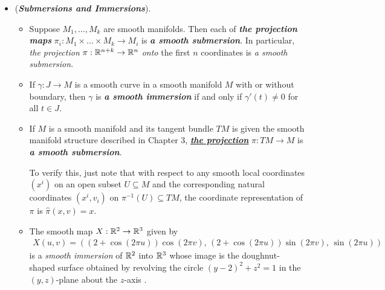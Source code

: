 \documentclass[11pt]{article}
\begin{document}
\begin{itemize}
\item \begin{example}(\emph{\textbf{Submersions and Immersions}}).
\begin{itemize}
\item Suppose $M_1,\ldots,M_k$ are smooth manifolds. Then each of \emph{\textbf{the projection maps}} $\pi_{i}: M_1\times \ldots \times M_k \rightarrow M_i$ is \emph{\textbf{a smooth submersion}}. In particular, \emph{the projection} $\pi: {\mathbb R}^{n+k} \rightarrow {\mathbb R}^n$ \emph{onto} the first $n$ coordinates is \emph{a smooth submersion}.
\item If $\gamma: J \rightarrow M$ is a smooth curve in a smooth manifold $M$ with or without boundary, then $\gamma$ is \emph{\textbf{a smooth immersion}} if and only if $\gamma'(t) \neq 0$ for all $t \in J$.
\item If $M$ is a smooth manifold and its tangent bundle $TM$ is given the smooth manifold structure described in Chapter 3, \underline{\emph{\textbf{the projection}}} $\pi: TM \rightarrow M$ is \emph{\textbf{a smooth submersion}}. 

To verify this, just note that with respect to any smooth local coordinates $(x^i)$ on an open subset $U \subseteq M$ and the corresponding natural coordinates $(x^i, v_i)$ on  $\pi^{-1}(U) \subseteq TM$, the coordinate representation of $\pi$ is $\widehat{\pi}(x, v) = x$.
\item The smooth map $X: {\mathbb R}^2 \rightarrow {\mathbb R}^3$ given by
\begin{align*}
X(u,v) =  ((2+ \cos(2\pi u))\cos(2\pi v),\, (2+\cos(2\pi u))\sin(2\pi v),\,\sin(2\pi u))
\end{align*} is a \emph{smooth immersion} of ${\mathbb R}^2$ into ${\mathbb R}^3$ whose image is the doughnut-shaped surface obtained by revolving the circle $(y -2)^2 + z^2 = 1$ in the $(y,z)$-plane about the $z$-axis .
\end{itemize}
\end{example}
\end{itemize}
\end{document}
